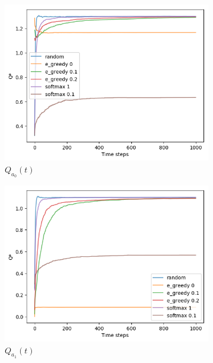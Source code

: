 \documentclass[letterpaper]{article}
\begin{document}
\begin{figure}[H]
  \begin{subfigure}{.5\textwidth}
    \centering
    \includegraphics[width=1\linewidth]{images/assign3/ex1/qta_0}
    \caption{$Q_{a_{0}}(t)$}
    \label{fig:qta_0_ex1}
  \end{subfigure}
  \begin{subfigure}{.5\textwidth}
    \centering
    \includegraphics[width=1\linewidth]{images/assign3/ex1/qta_1}
    \caption{$Q_{a_{1}}(t)$}
    \label{fig:qta_1_ex1}
  \end{subfigure}
  \begin{subfigure}{.5\textwidth}
    \centering

\end{subfigure}
\end{figure}
\end{document}
